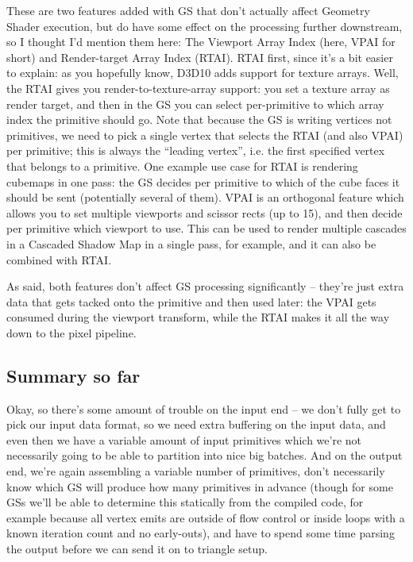 \documentclass[12pt]{article}
\begin{document}
These are two features added with GS that don’t actually affect Geometry Shader execution, but do have some effect on the processing further downstream, so I thought I’d mention them here: The Viewport Array Index (here, VPAI for short) and Render-target Array Index (RTAI). RTAI first, since it’s a bit easier to explain: as you hopefully know, D3D10 adds support for texture arrays. Well, the RTAI gives you render-to-texture-array support: you set a texture array as render target, and then in the GS you can select per-primitive to which array index the primitive should go. Note that because the GS is writing vertices not primitives, we need to pick a single vertex that selects the RTAI (and also VPAI) per primitive; this is always the “leading vertex”, i.e. the first specified vertex that belongs to a primitive. One example use case for RTAI is rendering cubemaps in one pass: the GS decides per primitive to which of the cube faces it should be sent (potentially several of them). VPAI is an orthogonal feature which allows you to set multiple viewports and scissor rects (up to 15), and then decide per primitive which viewport to use. This can be used to render multiple cascades in a Cascaded Shadow Map in a single pass, for example, and it can also be combined with RTAI.

As said, both features don’t affect GS processing significantly – they’re just extra data that gets tacked onto the primitive and then used later: the VPAI gets consumed during the viewport transform, while the RTAI makes it all the way down to the pixel pipeline.

\subsection{Summary so far}
\label{sec:orga607a13}

Okay, so there’s some amount of trouble on the input end – we don’t fully get to pick our input data format, so we need extra buffering on the input data, and even then we have a variable amount of input primitives which we’re not necessarily going to be able to partition into nice big batches. And on the output end, we’re again assembling a variable number of primitives, don’t necessarily know which GS will produce how many primitives in advance (though for some GSs we’ll be able to determine this statically from the compiled code, for example because all vertex emits are outside of flow control or inside loops with a known iteration count and no early-outs), and have to spend some time parsing the output before we can send it on to triangle setup.
\end{document}
